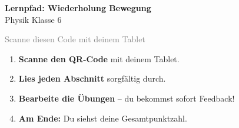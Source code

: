 \documentclass[11pt, a4paper]{article}
\begin{document}

\begin{center}
{\Huge\bfseries\textcolor{physik}{Lernpfad: Wiederholung Bewegung}}\\[0.5em]
{\large Physik Klasse 6}
\end{center}

\vspace{1em}


\begin{center}
\begin{tcolorbox}[
    colback=white,
    colframe=physik,
    boxrule=2pt,
    width=10cm,
    arc=0pt,
    halign=center
]
\vspace{0.5em}

\vspace{0.5em}
{\small\textcolor{gray}{Scanne diesen Code mit deinem Tablet}}
\end{tcolorbox}
\end{center}

\vspace{1em}


\begin{tcolorbox}[
    colback=physik-hell,
    colframe=physik,
    boxrule=1.5pt,
    arc=0pt,
    title={\large\bfseries So startest du:},
    coltitle=white,
    fonttitle=\sffamily
]

\begin{enumerate}[leftmargin=2em, itemsep=8pt, label={\textcolor{physik}{\Large\textbf{\arabic*.}}}]
    \item \textbf{Scanne den QR-Code} mit deinem Tablet.

    \item \textbf{Lies jeden Abschnitt} sorgfältig durch.

    \item \textbf{Bearbeite die Übungen} -- du bekommst sofort Feedback!

    \item \textbf{Am Ende:} Du siehst deine Gesamtpunktzahl.
\end{enumerate}

\end{tcolorbox}
\end{document}

